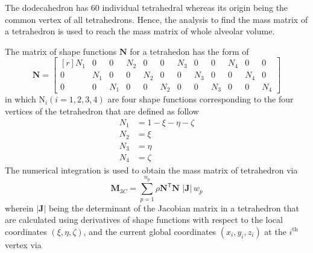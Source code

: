 The dodecahedron has 60 individual tetrahedral whereas its origin being the common vertex of all tetrahedrons. Hence, the analysis to find the mass matrix of a tetrahedron is used to reach the mass matrix of whole alveolar volume.

The matrix of shape functions $\mathbf{N}$ for a tetrahedon has the form of
\begin{equation}
	\mathbf{N} =  
\begin{bmatrix*}[r]
	N_1 & 0 & 0 & N_2 & 0 & 0 & N_3 & 0 & 0 & N_4 & 0 & 0 \\
	0 & N_1 & 0 & 0 & N_2 & 0 & 0 & N_3 & 0 & 0 & N_4 & 0 \\
	0 & 0 & N_1 & 0 & 0 & N_2 & 0 & 0 & N_3 & 0 & 0 & N_4
\end{bmatrix*} 
	\label{shape3D}
\end{equation}
in which $\mathrm{N}_i (i = 1, 2, 3, 4)$ are four shape functions corresponding to the four vertices of the tetrahedron that are defined as follow
\begin{subequations}
\begin{align}
	N_1 & = 1 - \xi - \eta - \zeta \\
	N_2 & = \xi \\
	N_3 & = \eta \\
	N_4 & = \zeta
\end{align}
\end{subequations}
The numerical integration is used to obtain the mass matrix of tetrahedron via
\begin{equation}
    \mathbf{M}_{3C} = \sum_{p=1}^{n_p} \rho  \mathbf{N}^{\mathsf{T}} \mathbf{N} \,  \,|\mathbf{J}| \, w_p
\end{equation}
wherein $|\mathbf{J}|$ being the determinant of the Jacobian matrix in a tetrahedron that are calculated using derivatives of shape functions with respect to the local coordinates $(\xi, \eta, \zeta)$, and the current global coordinates $(x_i, y_i, z_i)$ at the $i^{\mathrm{th}}$ vertex via
